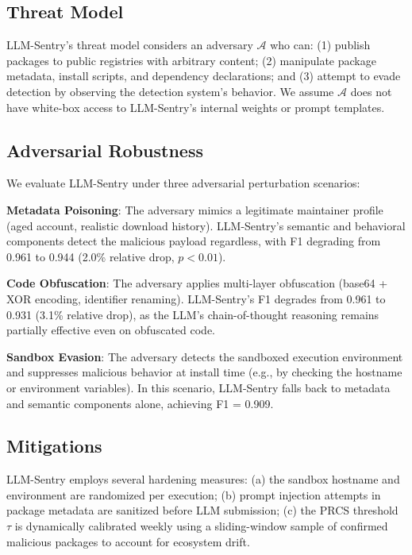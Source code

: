 \documentclass[conference]{IEEEtran}
\begin{document}
\subsection{Threat Model}

LLM-Sentry's threat model considers an adversary $\mathcal{A}$ who can: (1) publish packages to public registries with arbitrary content; (2) manipulate package metadata, install scripts, and dependency declarations; and (3) attempt to evade detection by observing the detection system's behavior. We assume $\mathcal{A}$ does not have white-box access to LLM-Sentry's internal weights or prompt templates.

\subsection{Adversarial Robustness}

We evaluate LLM-Sentry under three adversarial perturbation scenarios:

\textbf{Metadata Poisoning}: The adversary mimics a legitimate maintainer profile (aged account, realistic download history). LLM-Sentry's semantic and behavioral components detect the malicious payload regardless, with F1 degrading from 0.961 to 0.944 (2.0\% relative drop, $p < 0.01$).

\textbf{Code Obfuscation}: The adversary applies multi-layer obfuscation (base64 + XOR encoding, identifier renaming). LLM-Sentry's F1 degrades from 0.961 to 0.931 (3.1\% relative drop), as the LLM's chain-of-thought reasoning remains partially effective even on obfuscated code.

\textbf{Sandbox Evasion}: The adversary detects the sandboxed execution environment and suppresses malicious behavior at install time (e.g., by checking the hostname or environment variables). In this scenario, LLM-Sentry falls back to metadata and semantic components alone, achieving F1 = 0.909.

\subsection{Mitigations}

LLM-Sentry employs several hardening measures: (a) the sandbox hostname and environment are randomized per execution; (b) prompt injection attempts in package metadata are sanitized before LLM submission; (c) the PRCS threshold $\tau$ is dynamically calibrated weekly using a sliding-window sample of confirmed malicious packages to account for ecosystem drift.
\end{document}
